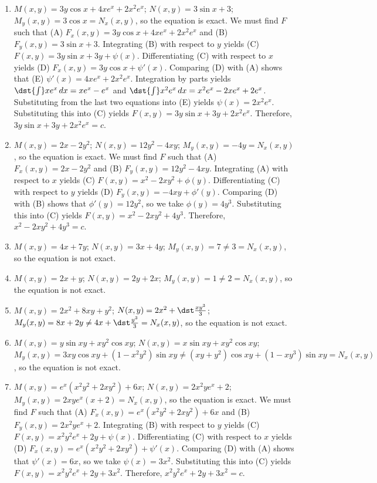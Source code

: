 \documentclass[openany]{book}
\newenvironment{sectionSolutions}{
 \begin{enumerate}[item-label={\thesection.\arabic{enumi}.}]
}{
 \end{enumerate}
}
\begin{document}
\begin{sectionSolutions}
\item
$M(x,y)=3y\cos x+4xe^x+2x^2e^x$;\;
$N(x,y)=3\sin x+3$;\;
$M_y(x,y)=3\cos x=N_x(x,y)$,
so the  equation is exact.
We must find $F$ such that
(A) $F_x(x,y)=3y\cos x+4xe^x+2x^2e^x$ and
(B) $F_y(x,y)=3\sin x+3$.
Integrating (B) with respect to $y$ yields
(C) $F(x,y)=3y\sin x+3y+\psi(x)$.
Differentiating (C) with respect to $x$  yields
(D) $F_x(x,y)=3y\cos x+\psi'(x)$.
Comparing (D) with (A)  shows that
(E) $\psi'(x)=4xe^x+2x^2e^x$.
Integration by parts yields
$\dst{\int}xe^x\,dx=xe^x-e^x$ and
$\dst{\int}x^2e^x\,dx=x^2e^x-2xe^x+2e^x$.
Substituting from the last two equations into (E) yields
$\psi(x)=2x^2e^x$.
Substituting this into (C) yields
$F(x,y)=3y\sin x+3y+2x^2e^x$.
Therefore, $3y\sin x+3y+2x^2e^x=c$.


\item
$M(x,y)=2x-2y^2$;\;
$N(x,y)=12y^2-4xy$;\;
$M_y(x,y)=-4y=N_x(x,y)$,
so the  equation is exact.
We must find $F$ such that
(A) $F_x(x,y)=2x-2y^2$ and
(B) $F_y(x,y)=12y^2-4xy$.
Integrating (A) with respect to $x$ yields
(C) $F(x,y)=x^2-2xy^2+\phi(y)$.
Differentiating (C) with respect to $y$  yields
(D) $F_y(x,y)=-4xy+\phi'(y)$.
Comparing (D) with (B)  shows that
$\phi'(y)=12y^2$, so we take
$\phi(y)=4y^3$.
Substituting this into (C) yields
$F(x,y)=x^2-2xy^2+4y^3$.
Therefore, $x^2-2xy^2+4y^3=c$.


\item
$M(x,y)=4x+7y$;\;
$N(x,y)=3x+4y$;\;
$M_y(x,y)=7\ne3=N_x(x,y)$,
so the  equation is not exact.

\item
$M(x,y)=2x+y$;\;
$N(x,y)=2y+2x$;\;
$M_y(x,y)=1\ne2=N_x(x,y)$,
so the  equation is not exact.


\item
$M(x,y)=2x^2+8xy+y^2$;\;
$N(x,y)=2x^2+\dst\frac{xy^3}{3}$;\;
$M_y(x,y)=8x+2y\ne4x+\dst\frac{y^3}{3}=N_x(x,y)$,
so the  equation is not exact.


\item
$M(x,y)=y\sin xy+xy^2\cos xy$;\;
$N(x,y)=x\sin xy+xy^2\cos xy$;\;
$M_y(x,y)=3xy\cos xy+(1-x^2y^2)\sin xy\ne(xy+y^2)\cos
xy+(1-xy^3)\sin xy=N_x(x,y)$, so the equation is not exact.


\item
$M(x,y)=e^x(x^2y^2+2xy^2)+6x$;\;
$N(x,y)=2x^2ye^x+2$;\;
$M_y(x,y)=2xye^x(x+2)=N_x(x,y)$,
so the  equation is  exact.
We must find $F$ such that
(A) $F_x(x,y)=e^x(x^2y^2+2xy^2)+6x$ and
(B) $F_y(x,y)=2x^2ye^x+2$.
Integrating (B) with respect to $y$ yields
(C) $F(x,y)=x^2y^2e^x+2y+\psi(x)$.
Differentiating (C) with respect to $x$  yields
(D) $F_x(x,y)=e^x(x^2y^2+2xy^2)+\psi'(x)$.
Comparing (D) with (A)  shows that
$\psi'(x)=6x$, so we take
$\psi(x)=3x^2$.
Substituting this into (C) yields
$F(x,y)=x^2y^2e^x+2y+3x^2$.
Therefore, $x^2y^2e^x+2y+3x^2=c$.



\end{sectionSolutions}
\end{document}
